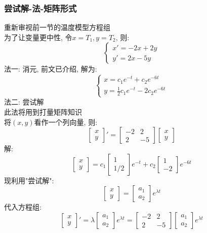 \subsubsection{\large 尝试解-法-矩阵形式}
重新审视前一节的温度模型方程组\\
为了让变量更中性, 令$x=T_1, y=T_2$, 则:
\[
\begin{cases}
    x' = -2 x + 2 y \\
    y' = 2 x - 5 y
\end{cases}
\]
法一: 消元, 前文已介绍, 解为:
\[
\begin{cases}
    x = c_1 e^{-t} + c_2 e^{-6t} \\
    y = \frac{1}{2}c_1 e^{-t} - 2c_2 e^{-6t}
\end{cases}
\]
法二: 尝试解\\
此法将用到打量矩阵知识\\
将$(x,y)$看作一个列向量, 则:
\[
\begin{bmatrix}
    x \\
    y
\end{bmatrix}' 
= 
\begin{bmatrix}
    -2 &  2 \\
     2 & -5
\end{bmatrix}
\begin{bmatrix}
    x \\
    y
\end{bmatrix}
\]
解:
\[
\begin{bmatrix}
    x \\
    y
\end{bmatrix}
=
c_1
\begin{bmatrix}
    1 \\
    1/2
\end{bmatrix}
e^{-t}
+
c_2
\begin{bmatrix}
    1 \\
    -2
\end{bmatrix}
e^{-6t}
\]
现利用"尝试解":
\[
\begin{bmatrix}
    x \\
    y
\end{bmatrix}
=
\begin{bmatrix}
    a_1 \\
    a_2
\end{bmatrix}
e^{\lambda t}
\]
代入方程组:
\[
\begin{bmatrix}
    x \\
    y
\end{bmatrix}'
=
\lambda 
\begin{bmatrix}
    a_1 \\
    a_2
\end{bmatrix}
e^{\lambda t}
=
\begin{bmatrix}
    -2 &  2 \\
     2 & -5
\end{bmatrix}
\begin{bmatrix}
    a_1 \\
    a_2
\end{bmatrix}
e^{\lambda t}
\]

